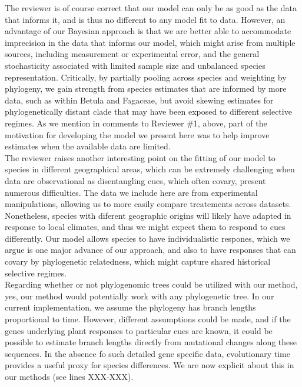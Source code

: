 \documentclass[11pt]{article}
\begin{document}
The reviewer is of course correct that our model can only be as good as the data that informs it, and is thus no different to any model fit to data. However, an advantage of our Bayesian approach is that we are better able to accommodate imprecision in the data that informs our model, which might arise from multiple sources, including measurement or experimental error, and the general stochasticity associated with limited sample size and unbalanced species representation. Critically, by partially pooling across species and weighting by phylogeny, we gain strength from species estimates that are informed by more data, such as within Betula and Fagaceae, but avoid skewing estimates for phylogenetically distant clade that may have been exposed to different selective regimes. As we mention in comments to Reviewer \#1, above, part of the motivation for developing the model we present here was to help improve estimates when the available data are limited.   %
\\


The reviewer raises another interesting point on the fitting of our model to species in different geographical areas, which can be extremely challenging when data are observational as disentangling cues, which often covary, present numerous difficulties. The data we include here are from experimental manipulations, allowing us to more easily compare treatements across datasets. Nonetheless, species with diferent geographic origins will likely have adapted in response to local climates, and thus we might expect them to respond to cues differently. Our model allows species to have individualistic respones, which we argue is one major advance of our approach, and also to have responses that can covary by phylogenetic relatedness, which might capture shared historical selective regimes.\\   

Regarding whether or not phylogenomic trees could be utilized with our method, yes, our method would potentially work with any phylogenetic tree. In our current implementation, we assume the phylogeny has branch lengths proportional to time. However, different assumptions could be made, and if the genes underlying plant responses to particular cues are known, it could be possible to estimate branch lengths directly from mutational changes along these sequences. In the absence fo such detailed gene specific data, evolutionary time provides a useful proxy for species differences. We are now explicit about this in our methods (see lines XXX-XXX). 
\end{document}
